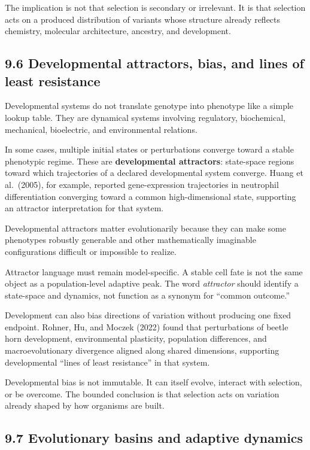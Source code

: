 \documentclass[
  11pt,
]{article}
\begin{document}
The implication is not that selection is secondary or irrelevant. It is
that selection acts on a produced distribution of variants whose
structure already reflects chemistry, molecular architecture, ancestry,
and development.

\subsection{9.6 Developmental attractors, bias, and lines of least
resistance}\label{developmental-attractors-bias-and-lines-of-least-resistance}

Developmental systems do not translate genotype into phenotype like a
simple lookup table. They are dynamical systems involving regulatory,
biochemical, mechanical, bioelectric, and environmental relations.

In some cases, multiple initial states or perturbations converge toward
a stable phenotypic regime. These are \textbf{developmental attractors}:
state-space regions toward which trajectories of a declared
developmental system converge. Huang et al.~(2005), for example,
reported gene-expression trajectories in neutrophil differentiation
converging toward a common high-dimensional state, supporting an
attractor interpretation for that system.

Developmental attractors matter evolutionarily because they can make
some phenotypes robustly generable and other mathematically imaginable
configurations difficult or impossible to realize.

Attractor language must remain model-specific. A stable cell fate is not
the same object as a population-level adaptive peak. The word
\emph{attractor} should identify a state-space and dynamics, not
function as a synonym for ``common outcome.''

Development can also bias directions of variation without producing one
fixed endpoint. Rohner, Hu, and Moczek (2022) found that perturbations
of beetle horn development, environmental plasticity, population
differences, and macroevolutionary divergence aligned along shared
dimensions, supporting developmental ``lines of least resistance'' in
that system.

Developmental bias is not immutable. It can itself evolve, interact with
selection, or be overcome. The bounded conclusion is that selection acts
on variation already shaped by how organisms are built.

\subsection{9.7 Evolutionary basins and adaptive
dynamics}\label{evolutionary-basins-and-adaptive-dynamics}
\end{document}

